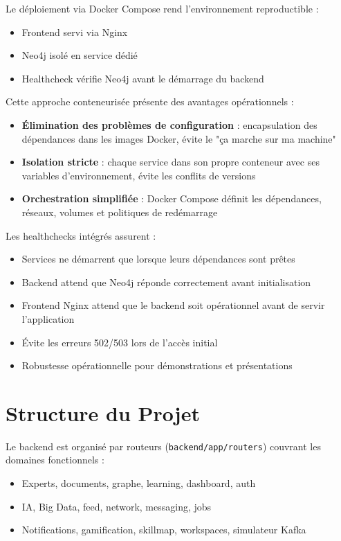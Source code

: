 \documentclass[12pt,a4paper]{report}
\begin{document}
Le déploiement via Docker Compose rend l'environnement reproductible :
\begin{itemize}
  \item Frontend servi via Nginx
  \item Neo4j isolé en service dédié
  \item Healthcheck vérifie Neo4j avant le démarrage du backend
\end{itemize}

Cette approche conteneurisée présente des avantages opérationnels :
\begin{itemize}
  \item \textbf{Élimination des problèmes de configuration} : encapsulation des dépendances dans les images Docker, évite le "ça marche sur ma machine"
  \item \textbf{Isolation stricte} : chaque service dans son propre conteneur avec ses variables d'environnement, évite les conflits de versions
  \item \textbf{Orchestration simplifiée} : Docker Compose définit les dépendances, réseaux, volumes et politiques de redémarrage
\end{itemize}

Les healthchecks intégrés assurent :
\begin{itemize}
  \item Services ne démarrent que lorsque leurs dépendances sont prêtes
  \item Backend attend que Neo4j réponde correctement avant initialisation
  \item Frontend Nginx attend que le backend soit opérationnel avant de servir l'application
  \item Évite les erreurs 502/503 lors de l'accès initial
  \item Robustesse opérationnelle pour démonstrations et présentations
\end{itemize}

\section{Structure du Projet}
Le backend est organisé par routeurs (\texttt{backend/app/routers}) couvrant les domaines fonctionnels :
\begin{itemize}
  \item Experts, documents, graphe, learning, dashboard, auth
  \item IA, Big Data, feed, network, messaging, jobs
  \item Notifications, gamification, skillmap, workspaces, simulateur Kafka
\end{itemize}
\end{document}
